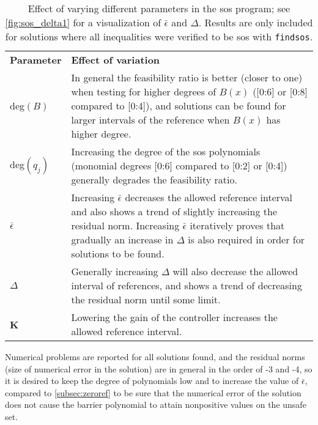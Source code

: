 
\begin{table}[htbp]
\begin{tabularx}{\textwidth}{l X}
\rowcolor{HeaderBlue}
\textbf{Parameter} & \textbf{Effect of variation}\\
deg$(B)$ & In general the feasibility ratio is better (closer to one) when testing for higher degrees of $B(x)$ ([0:6] or [0:8] compared to [0:4]), and solutions can be found for larger intervals of the reference when $B(x)$ has higher degree.\\
\rowcolor{textBlue}
deg$(q_j)$ & Increasing the degree of the \gls{sos} polynomials (monomial degrees [0:6] compared to [0:2] or [0:4]) generally degrades the feasibility ratio.\\
$\bar{\epsilon}$ & Increasing $\bar{\epsilon}$ decreases the allowed reference interval and also shows a trend of slightly increasing the residual norm. Increasing $\bar{\epsilon}$ iteratively proves that gradually an increase in $\Delta$ is also required in order for solutions to be found. \\
\rowcolor{textBlue}
$\Delta$ & Generally increasing $\Delta$ will also decrease the allowed interval of references, and shows a trend of decreasing the residual norm until some limit.\\
\textbf{K} & Lowering the gain of the controller increases  the allowed reference interval.
\end{tabularx}
\caption{Effect of varying different parameters in the \gls{sos} program; see \autoref{fig:sos_delta1} for a visualization of $\bar{\epsilon}$ and $\Delta$. Results are only included for solutions where all inequalities were verified to be \gls{sos} with \texttt{findsos}.}
\label{tab:sostools_varying_param}
\end{table}

Numerical problems are reported for all solutions found, and the residual norms (size of numerical error in the solution) are in general in the order of -3 and -4, so it is desired to keep the degree of polynomials low and to increase the value of $\bar{\epsilon}$, compared to \autoref{subsec:zeroref} to be sure that the numerical error of the solution does not cause the barrier polynomial to attain nonpositive values on the unsafe set. 


